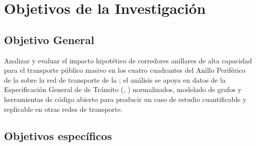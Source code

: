 
\section{Objetivos de la Investigación}
\label{sec:objetivos}

\subsection{Objetivo General}
\label{subsec:obj-general}

Analizar y evaluar el impacto hipotético de corredores anillares de alta
capacidad para el transporte público masivo en los cuatro cuadrantes
del Anillo Periférico de la \cdmx{} sobre la red de transporte de la \zmvm{}; 
el análisis se
apoya en datos de la Especificación General de  de Tránsito
(, \gtfs{}) normalizados, 
modelado de grafos y herramientas de código
abierto para producir un caso de estudio cuantificable y replicable en otras
redes de transporte.

\subsection{Objetivos específicos}
\label{subsec:obj-especificos}

